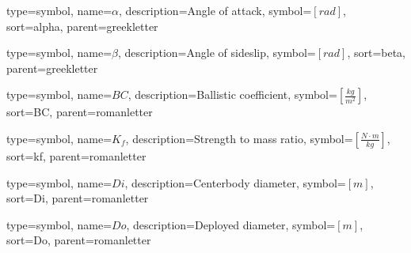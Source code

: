 {
	type=symbol, %
	name={\ensuremath{\alpha}}, %
	description={Angle of attack}, %
	symbol={$\left[rad \right]$}, %
	sort=alpha, %
	parent=greekletter %
}

{
	type=symbol, %
	name={\ensuremath{\beta}}, %
	description={Angle of sideslip}, %
	symbol={$\left[rad \right]$}, %
	sort=beta, %
	parent=greekletter %
}

{
type=symbol, %
name={\ensuremath{BC}}, %
description={Ballistic coefficient}, %
symbol={$\left[\frac{kg}{m^2} \right]$}, %
sort=BC, %
parent=romanletter %
}

{
type=symbol, %
name={\ensuremath{K_f}}, %
description={Strength to mass ratio}, %
symbol={$\left[\frac{N \cdot m}{kg} \right]$}, %
sort=kf, %
parent=romanletter %
}

{
type=symbol, %
name={\ensuremath{Di}}, %
description={Centerbody diameter}, %
symbol={$\left[m \right]$}, %
sort=Di, %
parent=romanletter %
}

{
type=symbol, %
name={\ensuremath{Do}}, %
description={Deployed diameter}, %
symbol={$\left[m \right]$}, %
sort=Do, %
parent=romanletter %
}

